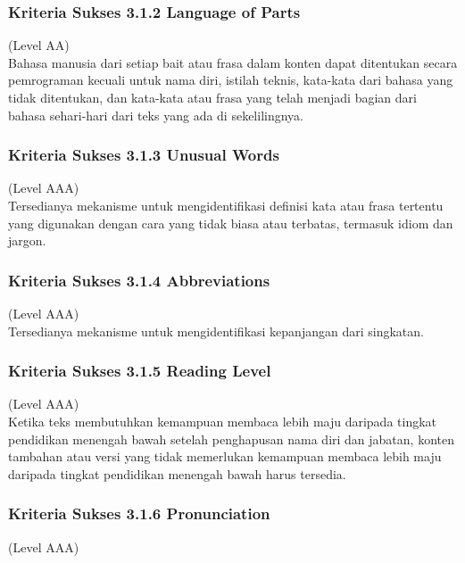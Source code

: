 \documentclass[a4paper,twoside]{article}
\begin{document}
\begin{enumerate}
		\subsubsection*{Kriteria Sukses 3.1.2 Language of Parts}
		\label{subsubsec:kriteria_3.1.2}
		(Level AA) \\
		
		Bahasa manusia dari setiap bait atau frasa dalam konten dapat ditentukan secara pemrograman kecuali untuk nama diri, istilah teknis, kata-kata dari bahasa yang tidak ditentukan, dan kata-kata atau frasa yang telah menjadi bagian dari bahasa sehari-hari dari teks yang ada di sekelilingnya.
		
		\subsubsection*{Kriteria Sukses 3.1.3 Unusual Words}
		\label{subsubsec:kriteria_3.1.3}
		(Level AAA) \\
		
		Tersedianya mekanisme untuk mengidentifikasi definisi kata atau frasa tertentu yang digunakan dengan cara yang tidak biasa atau terbatas, termasuk idiom dan jargon.
		
		\subsubsection*{Kriteria Sukses 3.1.4 Abbreviations}
		\label{subsubsec:kriteria_3.1.4}
		(Level AAA) \\
		
		Tersedianya mekanisme untuk mengidentifikasi kepanjangan dari singkatan.
		
		\subsubsection*{Kriteria Sukses 3.1.5 Reading Level}
		\label{subsubsec:kriteria_3.1.5}
		(Level AAA) \\
		
		Ketika teks membutuhkan kemampuan membaca lebih maju daripada tingkat pendidikan menengah bawah setelah penghapusan nama diri dan jabatan, konten tambahan atau versi yang tidak memerlukan kemampuan membaca lebih maju daripada tingkat pendidikan menengah bawah harus tersedia.
		
		\subsubsection*{Kriteria Sukses 3.1.6 Pronunciation}
		\label{subsubsec:kriteria_3.1.6}
		(Level AAA) \\
		

\end{enumerate}
\end{document}
